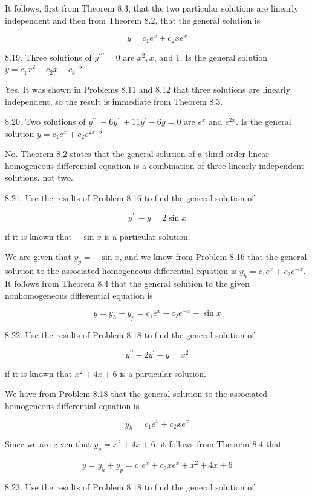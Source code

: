 \documentclass[10pt]{article}
\begin{document}
It follows, first from Theorem 8.3, that the two particular solutions are linearly independent and then from Theorem 8.2, that the general solution is

$$
y=c_{1} e^{x}+c_{2} x e^{x}
$$

8.19. Three solutions of $y^{\prime \prime \prime}=0$ are $x^{2}, x$, and 1. Is the general solution $y=c_{1} x^{2}+c_{2} x+c_{3}$ ?

Yes. It was shown in Problems 8.11 and 8.12 that three solutions are linearly independent, so the result is immediate from Theorem 8.3.

8.20. Two solutions of $y^{\prime \prime \prime}-6 y^{\prime \prime}+11 y^{\prime}-6 y=0$ are $e^{x}$ and $e^{2 x}$. Is the general solution $y=c_{1} e^{x}+c_{2} e^{2 x}$ ?

No. Theorem 8.2 states that the general solution of a third-order linear homogeneous differential equation is a combination of three linearly independent solutions, not two.

8.21. Use the results of Problem 8.16 to find the general solution of

$$
y^{\prime \prime}-y=2 \sin x
$$

if it is known that $-\sin x$ is a particular solution.

We are given that $y_{p}=-\sin x$, and we know from Problem 8.16 that the general solution to the associated homogeneous differential equation is $y_{h}=c_{1} e^{x}+c_{2} e^{-x}$. It follows from Theorem 8.4 that the general solution to the given nonhomogeneous differential equation is

$$
y=y_{h}+y_{p}=c_{1} e^{x}+c_{2} e^{-x}-\sin x
$$

8.22. Use the results of Problem 8.18 to find the general solution of

$$
y^{\prime \prime}-2 y^{\prime}+y=x^{2}
$$

if it is known that $x^{2}+4 x+6$ is a particular solution.

We have from Problem 8.18 that the general solution to the associated homogeneous differential equation is

$$
y_{h}=c_{1} e^{x}+c_{2} x e^{x}
$$

Since we are given that $y_{p}=x^{2}+4 x+6$, it follows from Theorem 8.4 that

$$
y=y_{h}+y_{p}=c_{1} e^{x}+c_{2} x e^{x}+x^{2}+4 x+6
$$

8.23. Use the results of Problem 8.18 to find the general solution of
\end{document}
